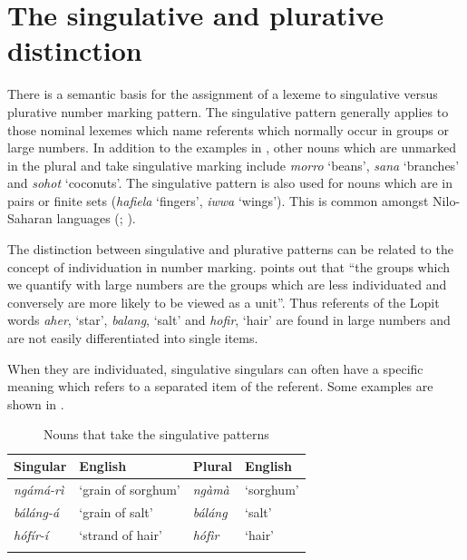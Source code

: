 \documentclass[output=paper]{langsci/langscibook}
\begin{document}
\section{The singulative and plurative distinction}\label{sec:moodie:3}

There is a semantic basis for the assignment of a lexeme to singulative versus plurative number marking pattern. The singulative pattern generally applies to those nominal lexemes which name referents which normally occur in groups or large numbers. In addition to the examples in , other nouns which are unmarked in the plural and take singulative marking include \textit{morro} ‘beans’, \textit{sana} ‘branches’ and \textit{sohot} ‘coconuts’. The singulative pattern is also used for nouns which are in pairs or finite sets (\textit{hafiela} ‘fingers’, \textit{iwwa} ‘wings’). This is common amongst Nilo-Saharan languages (\citealt[216]{Dimmendaal2000}; \citealt[119]{Creisselsetal2008}).

The distinction between singulative and plurative patterns can be related to the concept of individuation in number marking. \citet[217]{Corbett2000} points out that “the groups which we quantify with large numbers are the groups which are less individuated and conversely are more likely to be viewed as a unit”. Thus referents of the Lopit words \textit{aher}, ‘star’, \textit{balang}, ‘salt’ and \textit{hofir}, ‘hair’ are found in large numbers and are not easily differentiated into single items.

When they are individuated, singulative singulars can often have a specific meaning which refers to a separated item of the referent.  Some examples are shown in . 

\begin{table}
\begin{tabularx}{\textwidth}{XlXX}
\lsptoprule

\mdseries \textbf{Singular} & \mdseries \textbf{English} & \mdseries \textbf{Plural} & \mdseries \textbf{English}\\ \midrule
\itshape ngámá-rì & \mdseries ‘grain of sorghum’ & \itshape ngàmà & \mdseries ‘sorghum’\\
\itshape báláng-á & \mdseries ‘grain of salt’ & \itshape báláng & \mdseries ‘salt’\\
\itshape hófír-í & \mdseries ‘strand of hair’ & \itshape hófìr & \mdseries ‘hair’\\
\lspbottomrule
\end{tabularx}
\caption{Nouns that take the singulative patterns}
\label{tab:moodie:6}
\end{table}
\end{document}
